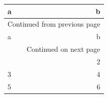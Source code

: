\documentclass[11pt]{article}
\author{root}
\date{\today}
\title{}
\begin{document}
\tableofcontents

\begin{longtable}{lr}
\toprule
a & b\\[0pt]
\midrule
\endfirsthead
\multicolumn{2}{l}{Continued from previous page} \\[0pt]
\toprule

a & b \\[0pt]

\midrule
\endhead
\midrule\multicolumn{2}{r}{Continued on next page} \\
\endfoot
\endlastfoot
1 & 2\\[0pt]
\midrule
3 & 4\\[0pt]
\midrule
5 & 6\\[0pt]
\bottomrule
\end{longtable}
\end{document}
